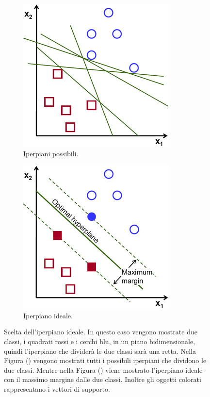 \documentclass[a4paper,12pt]{report}
\begin{document}
\begin{figure}[ht]
    \begin{subfigure}{0.47\textwidth}
        \centering
        \includegraphics[scale=0.5]{images/iperpiani_svm.png}
        \caption{Iperpiani possibili.}
        \label{fig:iperpiani_svm}
    \end{subfigure}
    \begin{subfigure}{0.47\textwidth}
        \centering
        \includegraphics[scale=0.5]{images/iperpiano_ottimale_svm.png}
        \caption{Iperpiano ideale.}
        \label{fig:iperpiano_ideale}
    \end{subfigure}
    \caption{Scelta dell'iperpiano ideale. In questo caso vengono mostrate due classi, i quadrati rossi e i cerchi blu, in un piano bidimensionale, quindi l'iperpiano che dividerà le due classi sarà una retta. Nella Figura (\protect{}) vengono mostrati tutti i possibili iperpiani che dividono le due classi. Mentre nella Figura (\protect{}) viene mostrato l'iperpiano ideale con il massimo margine dalle due classi. Inoltre gli oggetti colorati rappresentano i vettori di supporto. }
    \label{fig:svm}
\end{figure}
\end{document}
